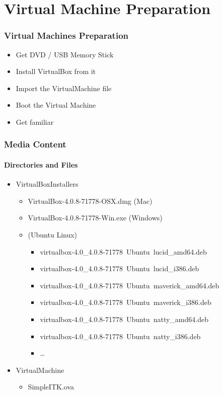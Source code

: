 \section{Virtual Machine Preparation}


\begin{frame}
\frametitle{Virtual Machines Preparation}
\begin{itemize}
\item Get DVD / USB Memory Stick
\item Install VirtualBox from it
\item Import the VirtualMachine file
\item Boot the Virtual Machine
\item Get familiar
\end{itemize}
\end{frame}

\begin{frame}
\frametitle{Media Content}
\framesubtitle{Directories and Files}
\begin{itemize}
\item VirtualBoxInstallers
\begin{itemize}
\item VirtualBox-4.0.8-71778-OSX.dmg (Mac)
\item VirtualBox-4.0.8-71778-Win.exe (Windows)
\item (Ubuntu Linux)
\begin{itemize}
\item virtualbox-4.0\_4.0.8-71778~Ubuntu~lucid\_amd64.deb
\item virtualbox-4.0\_4.0.8-71778~Ubuntu~lucid\_i386.deb
\item virtualbox-4.0\_4.0.8-71778~Ubuntu~maverick\_amd64.deb
\item virtualbox-4.0\_4.0.8-71778~Ubuntu~maverick\_i386.deb
\item virtualbox-4.0\_4.0.8-71778~Ubuntu~natty\_amd64.deb
\item virtualbox-4.0\_4.0.8-71778~Ubuntu~natty\_i386.deb
\item \ldots
\end{itemize}
\end{itemize}
\item VirtualMachine
\begin{itemize}
\item  SimpleITK.ova
\end{itemize}
\end{itemize}
\end{frame}

